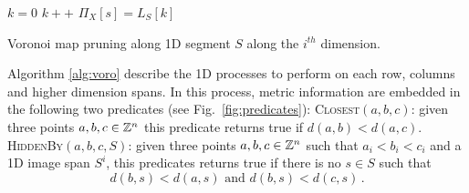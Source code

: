 \documentclass{llncs}
\begin{document}
\begin{algorithm}[H]\footnotesize
{ $k=0$\;
}
  {
          {
            $k++$\;
          }
    $\Pi_X[s] = L_S[k]$\;
  }

  \caption{Voronoi map pruning along 1D segment $S$ along the $i^{th}$
    dimension.\label{alg:voro}}
\end{algorithm}



Algorithm \ref{alg:voro} describe the 1D processes to perform on each
row, columns and higher dimension spans. In this process, metric
information are embedded in the following two predicates (see Fig.~\ref{fig:predicates}):
\textsc{Closest}$(a, b, c)$: given three points $a,b,c\in{\mathbb{Z}}^n$ this
predicate returns true if $d(a,b) < d(a,c)$. \textsc{HiddenBy}$(a, b,
c, S)$: given three points $a,b,c\in{\mathbb{Z}}^n$ such that $a_i<b_i<c_i$ and
a 1D image span $S^i$, this predicates returns true if there is no
$s\in S$ such that
    \begin{equation}
      d(b,s) < d(a,s)\text{ and }  d(b,s) < d(c,s)\,.
    \end{equation}
\end{document}
